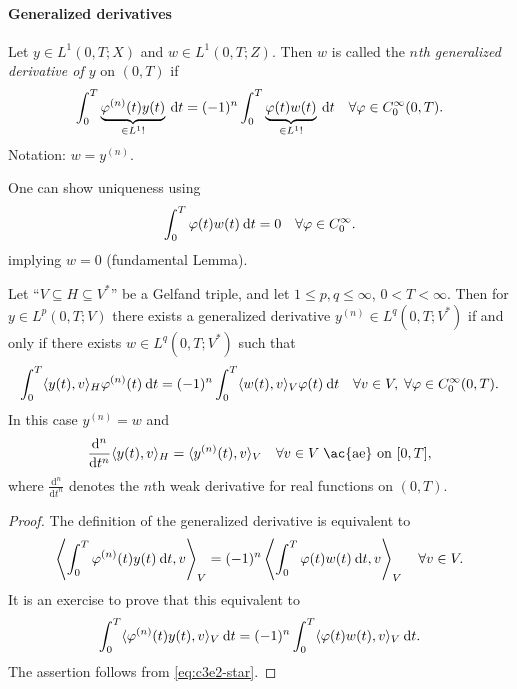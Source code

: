\documentclass[../skript.tex]{subfiles}
\begin{document}
\paragraph{Generalized derivatives}
\begin{definition} %
\label{def:c3e13}
Let $y \in L^1(0, T; X)$ and $w \in L^1(0, T; Z)$. Then $w$ is called the \emph{$n$th generalized derivative of $y$} on $(0, T)$ if
\[
	\int_0^T \underbrace{\varphi^{(n)}(t) y(t)}_{\in L^1 !} \:\mathrm{d}t = (-1)^n \int_0^T \underbrace{ \varphi(t) w(t) }_{\in L^1 !} \:\mathrm{d}t \quad \forall \varphi \in C_0^\infty(0, T).
\]
Notation: $w = y^{(n)}$.
\end{definition}
One can show uniqueness using
\[
	\int_0^T \varphi(t) w(t) \:\mathrm{d}t = 0 \quad \forall \varphi \in C_0^\infty.
\]
implying $w = 0$ (fundamental Lemma).
\begin{proposition}[Existence] %
\label{thm:c3e14}
Let ``$V \subseteq H \subseteq V^*$'' be a Gelfand triple, and let $1 \leq p, q \leq \infty$, $0 < T < \infty$.
Then for $y \in L^p(0, T; V)$ there exists a generalized derivative $y^{(n)} \in L^q(0, T; V^*)$ if and only if there exists $w \in L^q(0, T; V^*)$ such that
\[
	\int_0^T \langle y(t), v \rangle_H \varphi^{(n)}(t) \:\mathrm{d}t = (-1)^n \int_0^T \langle w(t), v \rangle_V \varphi(t) \:\mathrm{d}t \quad \forall v \in V, \; \forall \varphi \in C_0^\infty(0, T).
\]
In this case $y^{(n)} = w$ and
\[
	\frac{\mathrm{d}^n}{\mathrm{d} t^n} \langle y(t), v \rangle_H = \langle y^{(n)}(t), v \rangle_V \quad \forall v \in V \; \text{\ac{ae} on } [0, T],
\]
where $\frac{\mathrm{d}^n}{\mathrm{d} t^n}$ denotes the $n$th weak derivative for real functions on $(0, T)$.
\end{proposition}
\begin{proof}
The definition of the generalized derivative is equivalent to 
\[
	\left\langle \int_0^T \varphi^{(n)}(t) y(t) \:\mathrm{d}t, v \right\rangle_V = (-1)^n \left\langle \int_0^T \varphi(t) w(t) \:\mathrm{d}t, v \right\rangle_V \quad \forall v \in V.
\]
It is an exercise to prove that this equivalent to
\[
	\int_0^T \langle \varphi^{(n)} (t) y(t), v \rangle_V \:\mathrm{d}t = (-1)^n \int_0^T \langle \varphi(t) w(t), v \rangle_V \:\mathrm{d}t.
\]
The assertion follows from \cref{eq:c3e2-star}.
\end{proof}
\pagebreak
\end{document}
